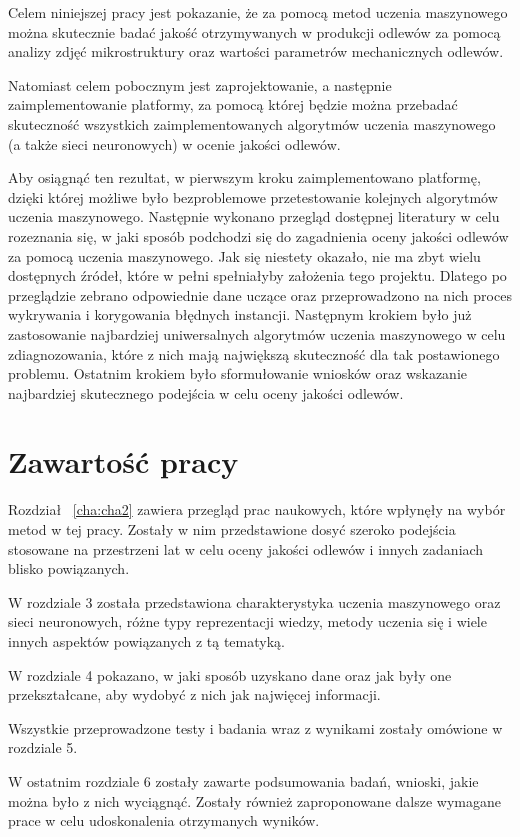 Celem niniejszej pracy jest pokazanie, że za pomocą metod uczenia maszynowego można skutecznie badać jakość otrzymywanych w produkcji odlewów za pomocą analizy zdjęć mikrostruktury oraz wartości parametrów mechanicznych odlewów. 

Natomiast celem pobocznym jest zaprojektowanie, a następnie zaimplementowanie platformy, za pomocą której będzie można przebadać skuteczność wszystkich zaimplementowanych algorytmów uczenia maszynowego (a także sieci neuronowych) w ocenie jakości odlewów. 

Aby osiągnąć ten rezultat, w pierwszym kroku zaimplementowano platformę, dzięki której możliwe było bezproblemowe przetestowanie kolejnych algorytmów uczenia maszynowego. Następnie wykonano przegląd dostępnej literatury w celu rozeznania się, w jaki sposób podchodzi się do zagadnienia oceny jakości odlewów za pomocą uczenia maszynowego. Jak się niestety okazało, nie ma zbyt wielu dostępnych źródeł, które w pełni spełniałyby założenia tego projektu. Dlatego po przeglądzie zebrano odpowiednie dane uczące oraz przeprowadzono na nich proces wykrywania i korygowania błędnych instancji. Następnym krokiem było już zastosowanie najbardziej uniwersalnych algorytmów uczenia maszynowego w celu zdiagnozowania, które z nich mają największą skuteczność dla tak postawionego problemu. Ostatnim krokiem było sformułowanie wniosków oraz wskazanie najbardziej skutecznego podejścia w celu oceny jakości odlewów.


\section{Zawartość pracy}

Rozdział ~\ref{cha:cha2} zawiera przegląd prac naukowych, które wpłynęły na wybór metod w tej pracy. Zostały w nim przedstawione dosyć szeroko podejścia stosowane na przestrzeni lat w celu oceny jakości odlewów i innych zadaniach blisko powiązanych. 

W rozdziale 3 została przedstawiona charakterystyka uczenia maszynowego oraz sieci neuronowych, różne typy reprezentacji wiedzy, metody uczenia się i wiele innych aspektów powiązanych z tą tematyką. 

W rozdziale 4 pokazano, w jaki sposób uzyskano dane oraz jak były one przekształcane, aby wydobyć z nich jak najwięcej informacji. 

Wszystkie przeprowadzone testy i badania wraz z wynikami zostały omówione w rozdziale 5. 

W ostatnim rozdziale 6 zostały zawarte podsumowania badań, wnioski, jakie można było z nich wyciągnąć. Zostały również zaproponowane dalsze wymagane prace w celu udoskonalenia otrzymanych wyników.













